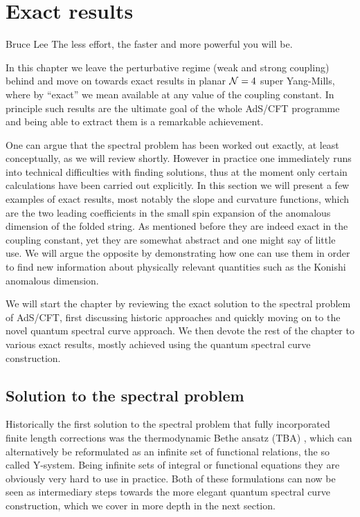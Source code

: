 
\section{Exact results}
\label{sec:exact_results}

\begin{chapquote}{Bruce Lee}
The less effort, the faster and more powerful you will be.
\end{chapquote}

\noindent In this chapter we leave the perturbative regime (weak and strong coupling) behind and move on towards exact results in planar $\mathcal{N}=4$ super Yang-Mills, where by ``exact'' we mean available at any value of the coupling constant.
In principle such results are the ultimate goal of the whole AdS/CFT programme and being able to extract them is a remarkable achievement.

One can argue that the spectral problem has been worked out exactly, at least conceptually, as we will review shortly.
However in practice one immediately runs into technical difficulties with finding solutions, thus at the moment only certain calculations have been carried out explicitly.
In this section we will present a few examples of exact results, most notably the slope and curvature functions, which are the two leading coefficients in the small spin expansion of the anomalous dimension of the folded string.
As mentioned before they are indeed exact in the coupling constant, yet they are somewhat abstract and one might say of little use.
We will argue the opposite by demonstrating how one can use them in order to find new information about physically relevant quantities such as the Konishi anomalous dimension.

We will start the chapter by reviewing the exact solution to the spectral problem of AdS/CFT, first discussing historic approaches and quickly moving on to the novel quantum spectral curve approach.
We then devote the rest of the chapter to various exact results, mostly achieved using the quantum spectral curve construction.


\subsection{Solution to the spectral problem}
\label{sec:tba_y_system}

Historically the first solution to the spectral problem that fully incorporated finite length corrections was the thermodynamic Bethe ansatz (TBA) \cite{Gromov:2009tv,Bombardelli:2009ns,Gromov:2009bc,Arutyunov:2009ur}, which can alternatively be reformulated as an infinite set of functional relations, the so called Y-system.
Being infinite sets of integral or functional equations they are obviously very hard to use in practice.
Both of these formulations can now be seen as intermediary steps towards the more elegant quantum spectral curve construction, which we cover in more depth in the next section.

